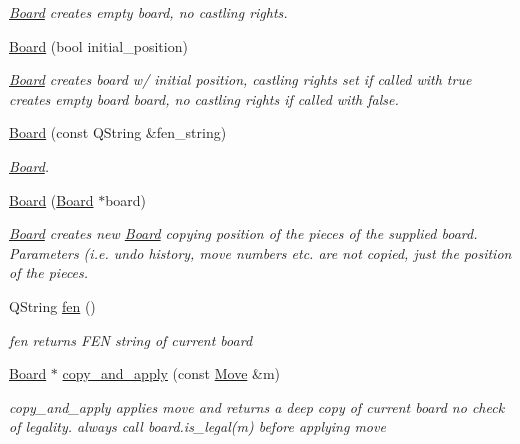 \begin{DoxyCompactItemize}
\begin{DoxyCompactList}\small\item\em \hyperlink{classchess_1_1Board}{Board} creates empty board, no castling rights. \end{DoxyCompactList}\item 
\hyperlink{classchess_1_1Board_af172f8f4202f976b9e08a602f7f7e104}{Board} (bool initial\-\_\-position)
\begin{DoxyCompactList}\small\item\em \hyperlink{classchess_1_1Board}{Board} creates board w/ initial position, castling rights set if called with true creates empty board board, no castling rights if called with false. \end{DoxyCompactList}\item 
\hyperlink{classchess_1_1Board_a147c213c864ad018056ca446e2de46b7}{Board} (const Q\-String \&fen\-\_\-string)
\begin{DoxyCompactList}\small\item\em \hyperlink{classchess_1_1Board}{Board}. \end{DoxyCompactList}\item 
\hyperlink{classchess_1_1Board_a98009c374d8ca3778124a2618ef1b36b}{Board} (\hyperlink{classchess_1_1Board}{Board} $\ast$board)
\begin{DoxyCompactList}\small\item\em \hyperlink{classchess_1_1Board}{Board} creates new \hyperlink{classchess_1_1Board}{Board} copying position of the pieces of the supplied board. Parameters (i.\-e. undo history, move numbers etc. are {\itshape not} copied, just the position of the pieces. \end{DoxyCompactList}\item 
Q\-String \hyperlink{classchess_1_1Board_acf162aeb9ab6abbb3e4d6a868e3a07e7}{fen} ()
\begin{DoxyCompactList}\small\item\em fen returns F\-E\-N string of current board \end{DoxyCompactList}\item 
\hyperlink{classchess_1_1Board}{Board} $\ast$ \hyperlink{classchess_1_1Board_afff07e23bb49d912617caf276323443e}{copy\-\_\-and\-\_\-apply} (const \hyperlink{classchess_1_1Move}{Move} \&m)
\begin{DoxyCompactList}\small\item\em copy\-\_\-and\-\_\-apply applies move and returns a deep copy of current board no check of legality. always call board.\-is\-\_\-legal(m) before applying move \end{DoxyCompactList}\item 

\end{DoxyCompactItemize}
